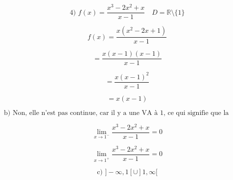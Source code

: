 \documentclass{article}
\begin{document}
\[
\text{4) } f(x) = \frac{x^3 - 2x^2 + x}{x - 1} \quad D = \mathbb{R} \setminus \{1\}
\]

\[
f(x) = \frac{x(x^2 - 2x + 1)}{x - 1}
\]

\[
= \frac{x(x - 1)(x - 1)}{x - 1}
\]

\[
= \frac{x(x - 1)^2}{x - 1}
\]

\[
= x(x - 1)
\]

\[
\text{b) Non, elle n'est pas continue, car il y a une VA à 1, ce qui signifie que la fonction ne peut pas être tracée en une seule fois.}
\]

\[
\lim_{x \to 1^-} \frac{x^3 - 2x^2 + x}{x - 1} = 0
\]

\[
\lim_{x \to 1^+} \frac{x^3 - 2x^2 + x}{x - 1} = 0
\]

\[
\text{c) }]-\infty, 1[ \cup ]1, \infty[
\]
\end{document}
